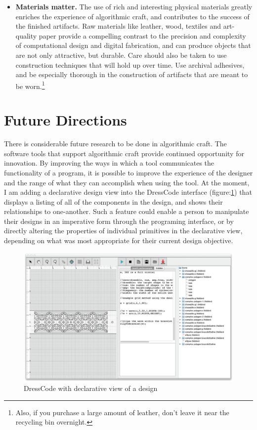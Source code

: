 \begin{itemize}
\item \textbf{Materials matter.} The use of rich and interesting physical materials greatly enriches the experience of algorithmic craft, and contributes to the success of the finished artifacts. Raw materials like leather, wood, textiles and art-quality paper provide a compelling contrast to the precision and complexity of computational design and digital fabrication, and can produce objects that are not only attractive, but durable. Care should also be taken to use construction techniques that will hold up over time. Use archival adhesives, and be especially thorough in the construction of artifacts that are meant to be worn.\footnote{Also, if you purchase a large amount of leather, don't leave it near the recycling bin overnight.}
\end{itemize}


\section{Future Directions}

	There is considerable future research to be done in algorithmic craft. The software tools that support algorithmic craft provide continued opportunity for innovation.  By improving the ways in which a tool communicates the functionality of a program, it is possible to improve the experience of the designer and the range of what they can accomplish when using the tool. At the moment, I am adding a declarative design view into the DressCode interface (figure:\ref{fig:declarative_view}) that displays a listing of all of the components in the design, and shows their relationships to one-another. Such a feature could enable a person to manipulate their designs in an imperative form through the programing interface, or by directly altering the properties of individual primitives in the declarative view, depending on what was most appropriate for their current design objective.

 \begin{center}
\begin{figure}[h!]
\includegraphics[width=\columnwidth]{images/declarative_view.png}
\caption{DressCode with declarative view of a design}
\label{fig:declarative_view}
\end{figure}
\end{center}

